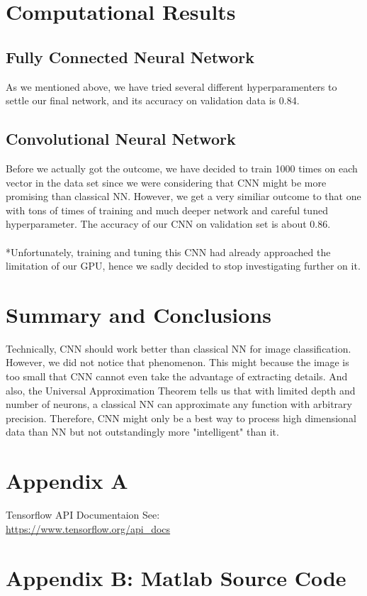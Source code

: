 \documentclass[12pt]{article}
\begin{document}
\section{Computational Results}
\subsection{Fully Connected Neural Network}
As we mentioned above, we have tried several different hyperparamenters to settle our final network, and its accuracy on validation data is 0.84.
\subsection{Convolutional Neural Network}
Before we actually got the outcome, we have decided to train 1000 times on each vector in the data set since we were considering that CNN might be more promising than classical NN. However, we get a very similiar outcome to that one with tons of times of training and much deeper network and careful tuned hyperparameter. The accuracy of our CNN on validation set is about 0.86.
\\
\\
*Unfortunately, training and tuning this CNN had already approached the limitation of our GPU, hence we sadly decided to stop investigating further on it.
\section{Summary and Conclusions}
Technically, CNN should work better than classical NN for image classification. However, we did not notice that phenomenon. This might because the image is too small that CNN cannot even take the advantage of extracting details. And also, the Universal Approximation Theorem tells us that with limited depth and number of neurons, a classical NN can approximate any function with arbitrary precision. Therefore, CNN might only be a best way to process high dimensional data than NN but not outstandingly more "intelligent" than it.
\section{Appendix A}
Tensorflow API Documentaion See:\\
 \url{https://www.tensorflow.org/api_docs}
\section{Appendix B: Matlab Source Code}
\end{document}
